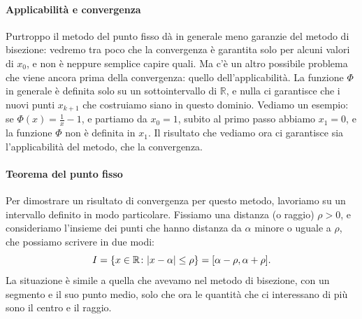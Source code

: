 \documentclass[a4paper]{report}
\DeclarePairedDelimiter{\abs}{\lvert}{\rvert}
\theoremstyle{definition}
\theoremstyle{remark}
\begin{document}
\paragraph{Applicabilità e convergenza} Purtroppo il metodo del punto fisso dà in generale meno garanzie del metodo di bisezione: vedremo tra poco che la convergenza è garantita solo per alcuni valori di $x_0$, e non è neppure semplice capire quali. Ma c'è un altro possibile problema che viene ancora prima della convergenza: quello dell'applicabilità. La funzione $\Phi$ in generale è definita solo su un sottointervallo di $\mathbb{R}$, e nulla ci garantisce che i nuovi punti $x_{k+1}$ che costruiamo siano in questo dominio. Vediamo un esempio: se $\Phi(x) = \frac{1}{x} - 1$, e partiamo da $x_0=1$, subito al primo passo abbiamo $x_1=0$, e la funzione $\Phi$ non è definita in $x_1$. Il risultato che vediamo ora ci garantisce sia l'applicabilità del metodo, che la convergenza.

\paragraph{Teorema del punto fisso} Per dimostrare un risultato di convergenza per questo metodo, lavoriamo su un intervallo definito in modo particolare. Fissiamo una distanza (o raggio) $\rho>0$, e consideriamo l'insieme dei punti che hanno distanza da $\alpha$ minore o uguale a $\rho$, che possiamo scrivere in due modi:
\begin{equation} \label{intervallo centrato in alpha}
    I = \{x\in\mathbb{R} \colon \abs{x-\alpha} \leq \rho\} = [\alpha-\rho, \alpha + \rho].
\end{equation}
La situazione è simile a quella che avevamo nel metodo di bisezione, con un segmento e il suo punto medio, solo che ora le quantità che ci interessano di più sono il centro e il raggio.

\begin{center}
\end{center}
\end{document}
